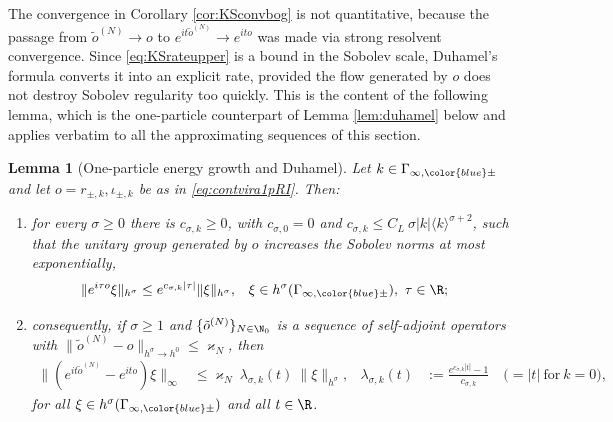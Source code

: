\documentclass[a4paper, 11pt]{article}
\DeclareMathOperator{\1}{\mathds{1}}
\newtheorem{lemma}[thm]{Lemma}
\begin{document}
The convergence in Corollary \ref{cor:KSconvbog} is not quantitative, because the passage from $\tilde{o}^{(N)}\rightarrow o$ to $e^{it\tilde{o}^{(N)}}\rightarrow e^{ito}$ was made via strong resolvent convergence. Since \eqref{eq:KSrateupper} is a bound in the Sobolev scale, Duhamel's formula converts it into an explicit rate, provided the flow generated by $o$ does not destroy Sobolev regularity too quickly. This is the content of the following lemma, which is the one-particle counterpart of Lemma \ref{lem:duhamel} below and applies verbatim to all the approximating sequences of this section.

\begin{lemma}[One-particle energy growth and Duhamel]
\label{lem:duhamel1p}
Let $k\in\Gamma_{\infty,{\color{blue}\pm}}$ and let $o = r_{\pm,k},\iota_{\pm,k}$ be as in \eqref{eq:contvira1pRI}. Then:
\begin{enumerate}
\item[(i)] for every $\sigma\geq0$ there is $c_{\sigma,k}\geq0$, with $c_{\sigma,0}=0$ and $c_{\sigma,k}\leq C_{L}\!\ \sigma|k|\langle k\rangle^{\sigma+2}$, such that the unitary group generated by $o$ increases the Sobolev norms at most exponentially,
\begin{align}
\label{eq:sobolevgrowth1p}
\|e^{i\tau o}\xi\|_{h^{\sigma}} & \leq e^{c_{\sigma,k}|\tau|}\|\xi\|_{h^{\sigma}}, & \xi & \in h^{\sigma}(\Gamma_{\infty,{\color{blue}\pm}}),\ \tau\in\R;
\end{align}
\item[(ii)] consequently, if $\sigma\geq1$ and $\{\tilde{o}^{(N)}\}_{N\in\N_{0}}$ is a sequence of self-adjoint operators with $\|\tilde{o}^{(N)}-o\|_{h^{\sigma}\rightarrow h^{0}}\leq\varkappa_{N}$, then
\begin{align}
\label{eq:duhamel1p}
\big\|(e^{it\tilde{o}^{(N)}}-e^{ito})\xi\big\|_{\infty} & \leq \varkappa_{N}\!\ \lambda_{\sigma,k}(t)\!\ \|\xi\|_{h^{\sigma}}, & \lambda_{\sigma,k}(t) & := \tfrac{e^{c_{\sigma,k}|t|}-1}{c_{\sigma,k}}\quad\big(=|t|\ \text{for}\ k=0\big),
\end{align}
for all $\xi\in h^{\sigma}(\Gamma_{\infty,{\color{blue}\pm}})$ and all $t\in\R$.
\end{enumerate}
\end{lemma}
\end{document}
